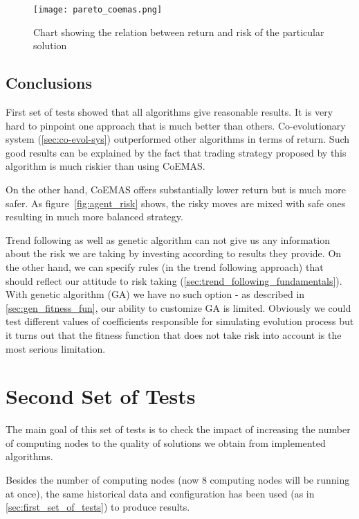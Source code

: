\begin{figure}[ht]
  \begin{center}
    \texttt{[image: pareto\_coemas.png]}
  \end{center}
  \caption{Chart showing the relation between return and risk of the particular solution}
  \label{fig:pareto_coemas}
\end{figure}


\subsection{Conclusions}

First set of tests showed that all algorithms give reasonable results.
It is very hard to pinpoint one approach that is much better than others.
Co-evolutionary system (\ref{sec:co-evol-sys}) outperformed other algorithms in terms of return.
Such good results can be explained by the fact that trading strategy proposed by this algorithm is much riskier than using CoEMAS.
  
On the other hand, CoEMAS offers substantially lower return but is much more safer.
As figure~\ref{fig:agent_risk} shows, the risky moves are mixed with safe ones resulting in much more balanced strategy.

Trend following as well as genetic algorithm can not give us any information about the risk we are taking by investing according to results they provide.
On the other hand, we can specify rules (in the trend following approach) that should reflect our attitude to risk taking (\ref{sec:trend_following_fundamentals}).
With genetic algorithm (GA) we have no such option - as described in \ref{sec:gen_fitness_fun}, our ability to customize GA is limited.
Obviously we could test different values of coefficients responsible for simulating evolution process but it turns out that the fitness function that does not take risk into
account is the most serious limitation.


\section{Second Set of Tests}

The main goal of this set of tests is to check the impact of increasing the number of computing nodes to the quality of solutions we obtain from implemented algorithms.

Besides the number of computing nodes (now 8 computing nodes will be running at once), the same historical data and configuration has been
 used (as in \ref{sec:first_set_of_tests}) to produce results.



